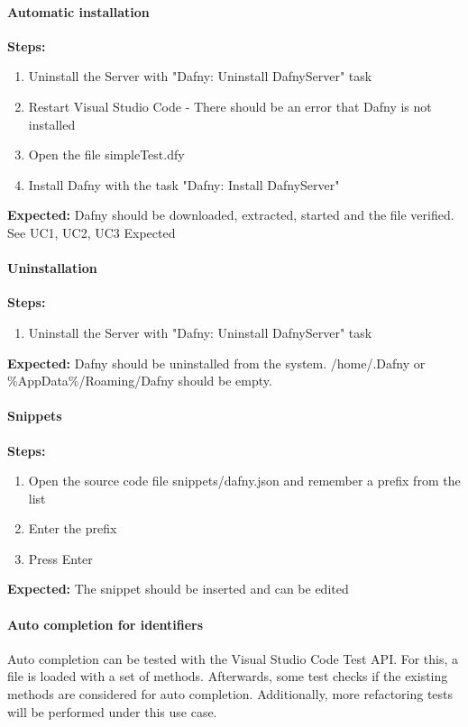 \paragraph{Automatic installation}
\textbf{\newline Steps:}
\begin{enumerate}
	\item Uninstall the Server with "Dafny: Uninstall DafnyServer" task
	\item Restart Visual Studio Code - There should be an error that Dafny is not installed
	\item Open the file simpleTest.dfy
	\item Install Dafny with the task "Dafny: Install DafnyServer" 
\end{enumerate}
\textbf{\newline Expected:}
Dafny should be downloaded, extracted, started and the file verified. See UC1, UC2, UC3 Expected

\paragraph{Uninstallation}
\textbf{\newline Steps:}
\begin{enumerate}
	\item Uninstall the Server with "Dafny: Uninstall DafnyServer" task
\end{enumerate}
\textbf{\newline Expected:}
Dafny should be uninstalled from the system. /home/.Dafny or \%AppData\%/Roaming/Dafny should be empty.

\paragraph{Snippets}
\textbf{\newline Steps:}
\begin{enumerate}
	\item Open the source code file snippets/dafny.json and remember a prefix from the list
	\item Enter the prefix 
	\item Press Enter
\end{enumerate}
\textbf{\newline Expected:}
The snippet should be inserted and can be edited

\paragraph{Auto completion for identifiers}
Auto completion can be tested with the Visual Studio Code Test API. For this, a file is loaded with a set of methods. Afterwards, some test checks if the existing methods are considered for auto completion. Additionally, more refactoring tests will be performed under this use case. 

